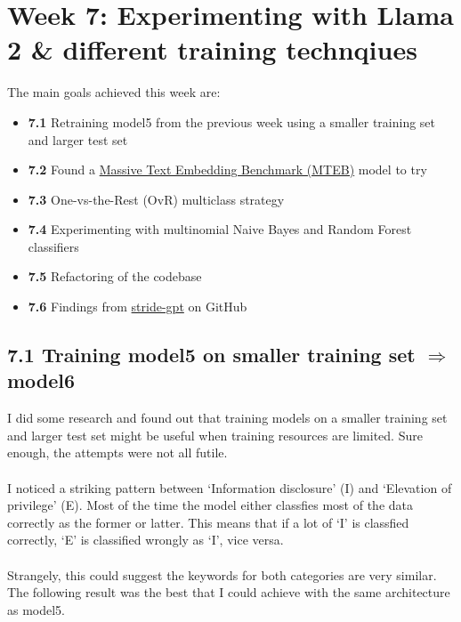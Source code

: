 \section*{Week 7: Experimenting with Llama 2 \& different training technqiues}

The main goals achieved this week are:
\begin{itemize}[topsep=0pt]
    \item \textbf{7.1} Retraining model5 from the previous week using a smaller training set and larger test set
    \item \textbf{7.2} Found a \href{https://arxiv.org/pdf/2210.07316.pdf}{Massive Text Embedding Benchmark (MTEB)} model to try
    \item \textbf{7.3} One-vs-the-Rest (OvR) multiclass strategy
    \item \textbf{7.4} Experimenting with multinomial Naive Bayes and Random Forest classifiers
    \item \textbf{7.5} Refactoring of the codebase
    \item \textbf{7.6} Findings from \href{https://github.com/mrwadams/stride-gpt?tab=readme-ov-file#usage}{stride-gpt} on GitHub
\end{itemize}

\subsection*{7.1 Training model5 on smaller training set $\Longrightarrow$ model6}
I did some research and found out that training models on a smaller training set and larger test set might be useful when training resources are limited.
Sure enough, the attempts were not all futile. \\\\
I noticed a striking pattern between `Information disclosure' (I) and `Elevation of privilege' (E). Most of the time the model either classfies most of the data correctly as the former or latter. This means that if a lot of `I' is classfied correctly, `E' is classified wrongly as `I', vice versa. \\\\
Strangely, this could suggest the keywords for both categories are very similar. The following result was the best that I could achieve with the same architecture as model5. \\

